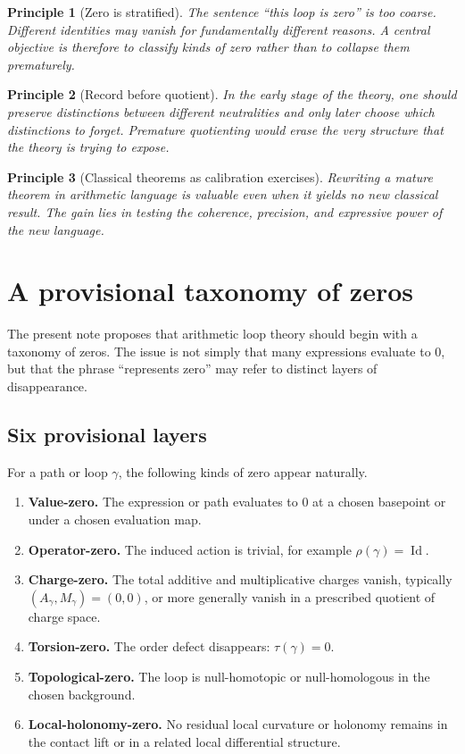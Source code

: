 \documentclass[11pt]{article}
\newtheorem{principle}{Principle}[section]
\newcommand{\Id}{\operatorname{Id}}
\begin{document}
\begin{principle}[Zero is stratified]
The sentence ``this loop is zero'' is too coarse. Different identities may vanish for fundamentally different reasons. A central objective is therefore to classify kinds of zero rather than to collapse them prematurely.
\end{principle}

\begin{principle}[Record before quotient]
In the early stage of the theory, one should preserve distinctions between different neutralities and only later choose which distinctions to forget. Premature quotienting would erase the very structure that the theory is trying to expose.
\end{principle}

\begin{principle}[Classical theorems as calibration exercises]
Rewriting a mature theorem in arithmetic language is valuable even when it yields no new classical result. The gain lies in testing the coherence, precision, and expressive power of the new language.
\end{principle}

\section{A provisional taxonomy of zeros}

The present note proposes that arithmetic loop theory should begin with a taxonomy of zeros. The issue is not simply that many expressions evaluate to $0$, but that the phrase ``represents zero'' may refer to distinct layers of disappearance.

\subsection{Six provisional layers}

For a path or loop $\gamma$, the following kinds of zero appear naturally.

\begin{enumerate}[label=\arabic*.]
\item \textbf{Value-zero.} The expression or path evaluates to $0$ at a chosen basepoint or under a chosen evaluation map.
\item \textbf{Operator-zero.} The induced action is trivial, for example $\rho(\gamma)=\Id$.
\item \textbf{Charge-zero.} The total additive and multiplicative charges vanish, typically $(A_\gamma,M_\gamma)=(0,0)$, or more generally vanish in a prescribed quotient of charge space.
\item \textbf{Torsion-zero.} The order defect disappears: $\tau(\gamma)=0$.
\item \textbf{Topological-zero.} The loop is null-homotopic or null-homologous in the chosen background.
\item \textbf{Local-holonomy-zero.} No residual local curvature or holonomy remains in the contact lift or in a related local differential structure.
\end{enumerate}
\end{document}
